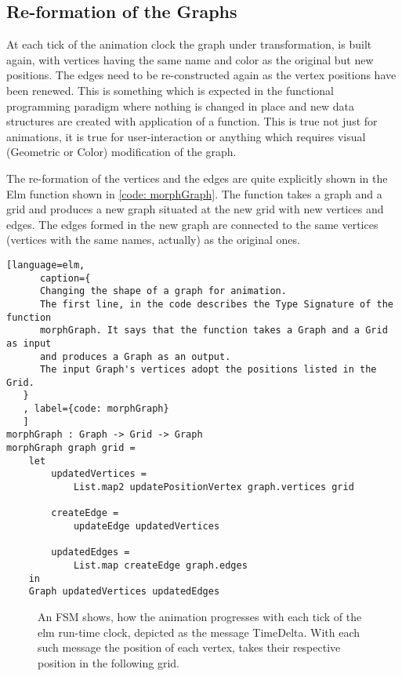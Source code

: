 \subsection{Re-formation of the Graphs}
At each tick of the animation clock the graph under transformation, is built
again, with vertices having the same name and color as the original but new
positions. The edges need to be re-constructed again as the vertex positions
have been renewed. This is something which is expected in the functional
programming paradigm where nothing is changed in place and new data structures
are created with application of a function. This is true not just for
animations, it is true for user-interaction or anything which requires visual
(Geometric or Color) modification of the graph.

The re-formation of the vertices and the edges are quite explicitly shown in
the Elm function shown in \autoref{code: morphGraph}. The function takes a
graph and a grid and produces a new graph situated at the new grid with new
vertices and edges.  The edges formed in the new graph are connected to the
same vertices (vertices with the same names, actually) as the original ones.

\begin{lstlisting}[language=elm, 
      caption={
      Changing the shape of a graph for animation.
      The first line, in the code describes the Type Signature of the function
      morphGraph. It says that the function takes a Graph and a Grid as input
      and produces a Graph as an output.
      The input Graph's vertices adopt the positions listed in the Grid.
   }
   , label={code: morphGraph}
   ]
morphGraph : Graph -> Grid -> Graph
morphGraph graph grid =
    let
        updatedVertices =
            List.map2 updatePositionVertex graph.vertices grid

        createEdge =
            updateEdge updatedVertices

        updatedEdges =
            List.map createEdge graph.edges
    in
    Graph updatedVertices updatedEdges

\end{lstlisting}

\begin{figure}[ht] %
\centering %
\caption{ An FSM shows, how the animation progresses with
          each tick of the elm run-time clock, depicted as the message TimeDelta.
          With each such message the position of each vertex, takes their
          respective position in the following grid.
        }
\label{fig: animationFSM}
\end{figure}

